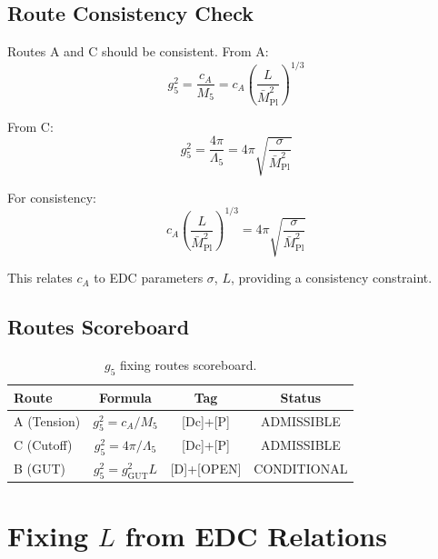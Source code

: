 \documentclass[11pt,a4paper]{article}
\begin{document}
\subsection{Route Consistency Check}
\label{subsec:route-consistency}

Routes A and C should be consistent. From A:
\begin{equation}
\label{eq:consistency-a}
g_5^2 = \frac{c_A}{M_5} = c_A \left(\frac{L}{\bar{M}_{\text{Pl}}^2}\right)^{1/3}
\end{equation}

From C:
\begin{equation}
\label{eq:consistency-c}
g_5^2 = \frac{4\pi}{\Lambda_5} = 4\pi \sqrt{\frac{\sigma}{\bar{M}_{\text{Pl}}^2}}
\end{equation}

For consistency:
\begin{equation}
\label{eq:consistency-condition}
c_A \left(\frac{L}{\bar{M}_{\text{Pl}}^2}\right)^{1/3} = 4\pi \sqrt{\frac{\sigma}{\bar{M}_{\text{Pl}}^2}}
\end{equation}

This relates $c_A$ to EDC parameters $\sigma$, $L$, providing a consistency constraint.

\subsection{Routes Scoreboard}
\label{subsec:routes-scoreboard}

\begin{table}[ht]
\centering
\caption{$g_5$ fixing routes scoreboard.}
\label{tab:g5-scoreboard}
\begin{tabular}{lccc}
\toprule
Route & Formula & Tag & Status \\
\midrule
A (Tension) & $g_5^2 = c_A / M_5$ & [Dc]+[P] & ADMISSIBLE \\
C (Cutoff) & $g_5^2 = 4\pi / \Lambda_5$ & [Dc]+[P] & ADMISSIBLE \\
B (GUT) & $g_5^2 = g_{\text{GUT}}^2 L$ & [D]+[OPEN] & CONDITIONAL \\
\bottomrule
\end{tabular}
\end{table}

\section{Fixing $L$ from EDC Relations}
\label{sec:L-fixing}
\end{document}
